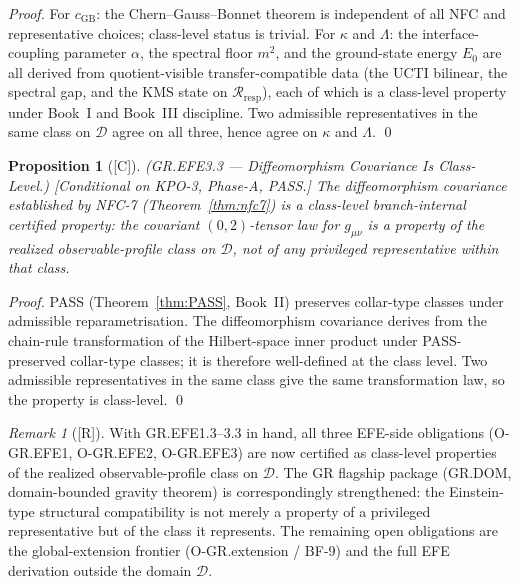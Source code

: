 \documentclass[12pt,oneside]{amsbook}
\theoremstyle{plain}
\newtheorem{proposition}[theorem]{Proposition}
\theoremstyle{definition}
\theoremstyle{remark}
\newtheorem{remark}[theorem]{Remark}
\newcommand{\status}[1]{\textup{[#1]}}
\begin{document}
\begin{proof}
For $c_{\mathrm{GB}}$: the Chern--Gauss--Bonnet theorem is independent
of all NFC and representative choices; class-level status is trivial.
For $\kappa$ and $\Lambda$: the interface-coupling parameter $\alpha$,
the spectral floor $m^2$, and the ground-state energy $E_0$ are all
derived from quotient-visible transfer-compatible data (the UCTI
bilinear, the spectral gap, and the KMS state on
$\mathcal{R}_{\mathrm{resp}}$), each of which is a class-level
property under Book~I and Book~III discipline. Two admissible
representatives in the same class on $\mathcal{D}$ agree on all three,
hence agree on $\kappa$ and $\Lambda$. \qed
\end{proof}

\begin{proposition}[\status{C}]\label{prop:EFE3-class-level}
\textup{(GR.EFE3.3 --- Diffeomorphism Covariance Is Class-Level.)}
\textup{[Conditional on KPO-3, Phase-A, PASS.]}
The diffeomorphism covariance established by NFC-7
(Theorem~\ref{thm:nfc7}) is a class-level branch-internal certified
property: the covariant $(0,2)$-tensor law for $g_{\mu\nu}$ is a
property of the realized observable-profile class on $\mathcal{D}$,
not of any privileged representative within that class.
\end{proposition}

\begin{proof}
PASS (Theorem~\ref{thm:PASS}, Book~II) preserves collar-type classes
under admissible reparametrisation. The diffeomorphism covariance
derives from the chain-rule transformation of the Hilbert-space inner
product under PASS-preserved collar-type classes; it is therefore
well-defined at the class level. Two admissible representatives in
the same class give the same transformation law, so the property is
class-level. \qed
\end{proof}

\begin{remark}[\status{R}]\label{rem:class-level-EFE-summary}
With GR.EFE1.3--3.3 in hand, all three EFE-side obligations
(O-GR.EFE1, O-GR.EFE2, O-GR.EFE3) are now certified as class-level
properties of the realized observable-profile class on $\mathcal{D}$.
The GR flagship package (GR.DOM, domain-bounded gravity theorem) is
correspondingly strengthened: the Einstein-type structural
compatibility is not merely a property of a privileged representative
but of the class it represents. The remaining open obligations are
the global-extension frontier (O-GR.extension / BF-9) and the full
EFE derivation outside the domain $\mathcal{D}$.
\end{remark}
\end{document}
